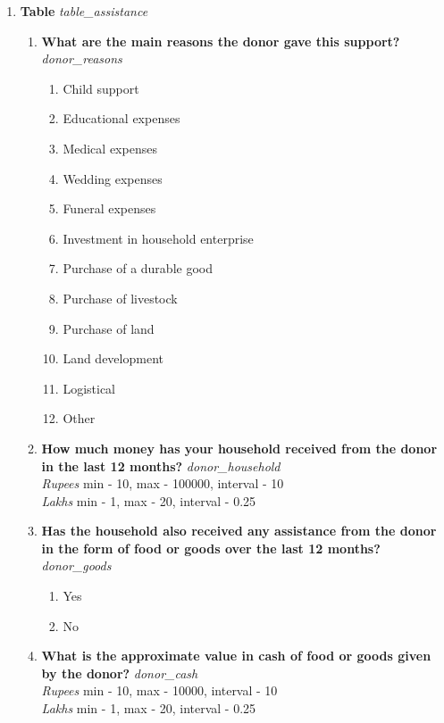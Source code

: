 \documentclass{article}
\begin{document}
\begin{enumerate}
\item {\bfseries Table}\emph{ table\_assistance } 
\begin{enumerate}[label*=\arabic*.] 
\item {\bfseries What are the main reasons the donor gave this support?}\emph{ donor\_reasons } 
\begin{enumerate} 
\item Child support 
\item Educational expenses 
\item Medical expenses 
\item Wedding expenses 
\item Funeral expenses 
\item Investment in household enterprise 
\item Purchase of a durable good 
\item Purchase of livestock 
\item Purchase of land 
\item Land development 
\item Logistical 
\item Other 
\end{enumerate} 
\item {\bfseries How much money has your household received from the donor in the last 12 months? }\emph{ donor\_household } 
\\ \emph{ Rupees }min - 10, max - 100000, interval - 10 
\\ \emph{ Lakhs }min - 1, max - 20, interval - 0.25 
 
\item {\bfseries Has the household also received any assistance from the donor  in the form of food or goods over the last 12 months?}\emph{ donor\_goods } 
\begin{enumerate} 
\item Yes 
\item No 
\end{enumerate} 
\item {\bfseries What is the approximate value in cash of food or goods given by the donor?}\emph{ donor\_cash } 
\\ \emph{ Rupees }min - 10, max - 10000, interval - 10 
\\ \emph{ Lakhs }min - 1, max - 20, interval - 0.25 
 

\end{enumerate}
\end{enumerate}
\end{document}
